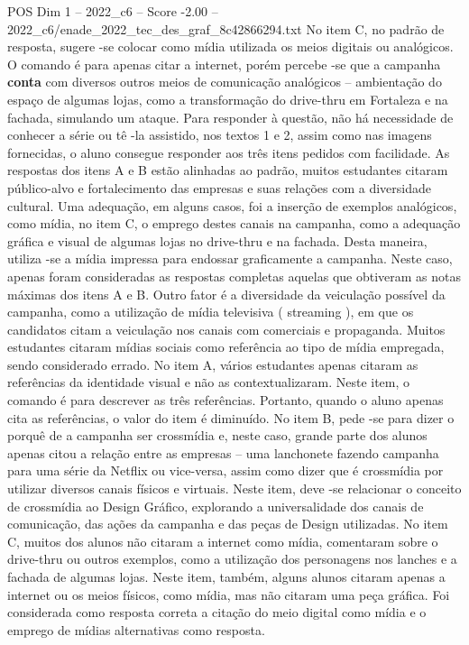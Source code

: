 \begin{textsample}{POS Dim 1 – 2022\_c6 – Score -2.00 – 2022\_c6/enade\_2022\_tec\_des\_graf\_8c42866294.txt}
No item C, no padrão de resposta, sugere -se colocar como mídia utilizada os meios digitais ou analógicos.
O comando é para apenas citar a internet, porém percebe -se que a campanha \textbf{conta} com diversos outros meios de comunicação analógicos – ambientação do espaço de algumas lojas, como a transformação do drive-thru em Fortaleza e na fachada, simulando um ataque.
Para responder à questão, não há necessidade de conhecer a série ou tê -la assistido, nos textos 1 e 2, assim como nas imagens fornecidas, o aluno consegue responder aos três itens pedidos com facilidade.
As respostas dos itens A e B estão alinhadas ao padrão, muitos estudantes citaram público-alvo e fortalecimento das empresas e suas relações com a diversidade cultural.
Uma adequação, em alguns casos, foi a inserção de exemplos analógicos, como mídia, no item C, o emprego destes canais na campanha, como a adequação gráfica e visual de algumas lojas no drive-thru e na fachada.
Desta maneira, utiliza -se a mídia impressa para endossar graficamente a campanha.
Neste caso, apenas foram consideradas as respostas completas aquelas que obtiveram as notas máximas dos itens A e B.
Outro fator é a diversidade da veiculação possível da campanha, como a utilização de mídia televisiva ( streaming ), em que os candidatos citam a veiculação nos canais com comerciais e propaganda.
Muitos estudantes citaram mídias sociais como referência ao tipo de mídia empregada, sendo considerado errado.
No item A, vários estudantes apenas citaram as referências da identidade visual e não as contextualizaram.
Neste item, o comando é para descrever as três referências.
Portanto, quando o aluno apenas cita as referências, o valor do item é diminuído.
No item B, pede -se para dizer o porquê de a campanha ser crossmídia e, neste caso, grande parte dos alunos apenas citou a relação entre as empresas – uma lanchonete fazendo campanha para uma série da Netflix ou vice-versa, assim como dizer que é crossmídia por utilizar diversos canais físicos e virtuais.
Neste item, deve -se relacionar o conceito de crossmídia ao Design Gráfico, explorando a universalidade dos canais de comunicação, das ações da campanha e das peças de Design utilizadas.
No item C, muitos dos alunos não citaram a internet como mídia, comentaram sobre o drive-thru ou outros exemplos, como a utilização dos personagens nos lanches e a fachada de algumas lojas.
Neste item, também, alguns alunos citaram apenas a internet ou os meios físicos, como mídia, mas não citaram uma peça gráfica.
Foi considerada como resposta correta a citação do meio digital como mídia e o emprego de mídias alternativas como resposta.

\end{textsample}
